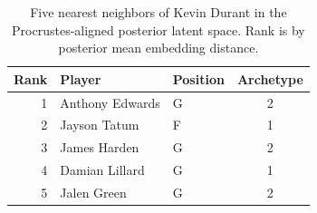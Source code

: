 \begin{table}[htbp]
  \centering\small
  \begin{tabular}{rllc}
    \toprule
    Rank & Player & Position & Archetype \\
    \midrule
    1 & Anthony Edwards & G & 2 \\
    2 & Jayson Tatum & F & 1 \\
    3 & James Harden & G & 2 \\
    4 & Damian Lillard & G & 1 \\
    5 & Jalen Green & G & 2 \\
    \bottomrule
  \end{tabular}
  \caption{Five nearest neighbors of Kevin Durant in the Procrustes-aligned posterior latent space. Rank is by posterior mean embedding distance.}
  \label{tab:Kevin_Durant_neighbors}
\end{table}

